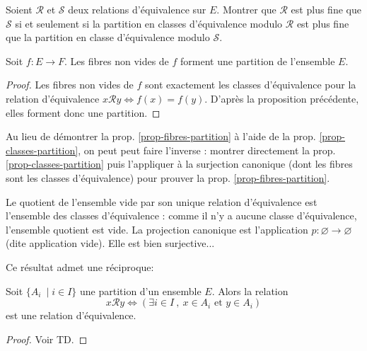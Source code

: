 \begin{exercice}
Soient $\mathcal R$ et $\mathcal S$ deux relations d'équivalence sur $E$. Montrer que $\mathcal R$ est plus fine que $\mathcal S$ si et seulement si la partition en classes d'équivalence modulo $\mathcal R$ est plus fine que la partition en classe d'équivalence modulo $\mathcal S$.
\end{exercice}

\begin{proposition}\label{prop-fibres-partition}
Soit $f : E\to F$. Les fibres non vides de $f$ forment une partition de l'ensemble $E$.
\end{proposition}
\begin{proof}
Les fibres non vides de $f$ sont exactement les classes d'équivalence pour la relation d'équivalence $x\mathcal R y \iff f(x)=f(y)$. D'après la proposition précédente, elles forment donc une partition.
\end{proof}

\begin{remarque}
Au lieu de démontrer la prop. \ref{prop-fibres-partition} à l'aide de la prop. \ref{prop-classes-partition}, on peut peut faire l'inverse : montrer directement la prop. \ref{prop-classes-partition} puis l'appliquer à la surjection canonique (dont les fibres sont les classes d'équivalence) pour prouver  la prop. \ref{prop-fibres-partition}.
\end{remarque}


\begin{remarque}[Zérologie] Le quotient de l'ensemble vide par son unique relation d'équivalence est l'ensemble des classes d'équivalence : comme il n'y a aucune classe d'équivalence, l'ensemble quotient est vide. La projection canonique est l'application $p : \varnothing \to \varnothing$ (dite application vide). Elle est bien surjective...
\end{remarque}

Ce résultat admet une \og réciproque\fg : 

\begin{proposition}
Soit $\{A_i\:\mid i\in I\}$ une partition d'un ensemble $E$. Alors la relation
\[
x\mathcal R y \iff \left( \exists i\in I\:,\: x\in A_i\text{ et } y\in A_i\right)
\]
est une relation d'équivalence.
\end{proposition}
\begin{proof}
Voir TD.
\end{proof}

